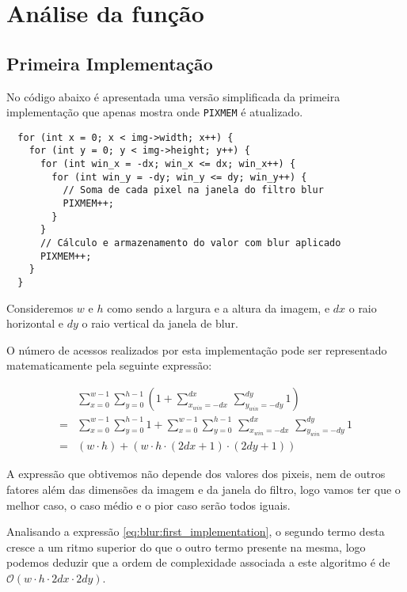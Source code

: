 \chapter{Análise da função }

\section{Primeira Implementação}

No código abaixo é apresentada uma versão simplificada da primeira implementação
que apenas mostra onde \Verb|PIXMEM| é atualizado.

\begin{listing}[H]
	\centering
	\begin{verbatim}
  for (int x = 0; x < img->width; x++) {
    for (int y = 0; y < img->height; y++) {
      for (int win_x = -dx; win_x <= dx; win_x++) {
        for (int win_y = -dy; win_y <= dy; win_y++) {
          // Soma de cada pixel na janela do filtro blur
          PIXMEM++;
        }
      }
      // Cálculo e armazenamento do valor com blur aplicado
      PIXMEM++;
    }
  }
  \end{verbatim}
\end{listing}

Consideremos $w$ e $h$ como sendo a largura e a altura da imagem, e $dx$
o raio horizontal e $dy$ o raio vertical da janela de blur.

O número de acessos realizados por esta implementação pode ser representado
matematicamente pela seguinte expressão:

\begin{align}
	  & \sum_{x = 0}^{w - 1} \sum_{y = 0}^{h - 1} \left(
	1 +
	\sum_{x_{win} = -dx}^{dx} \,
	\sum_{y_{win} = -dy}^{dy} 1
	\right)                                                       \\
	= & \sum_{x = 0}^{w - 1} \sum_{y = 0}^{h - 1} 1 +
	\sum_{x = 0}^{w - 1} \sum_{y = 0}^{h - 1} \,
	\sum_{x_{win} = -dx}^{dx} \, \sum_{y_{win} = -dy}^{dy} 1      \\
	= & (w \cdot h) + (w \cdot h \cdot (2dx + 1) \cdot (2dy + 1))
	\label{eq:blur:first_implementation}
\end{align}

A expressão que obtivemos não depende dos valores dos pixeis, nem de outros
fatores além das dimensões da imagem e da janela do filtro, logo vamos ter que o
melhor caso, o caso médio e o pior caso serão todos iguais.

Analisando a expressão \eqref{eq:blur:first_implementation}, o segundo termo
desta cresce a um ritmo superior do que o outro termo presente na mesma, logo
podemos deduzir que a ordem de complexidade associada a este algoritmo é de
$\mathcal{O}(w \cdot h \cdot 2dx \cdot 2dy)$.

